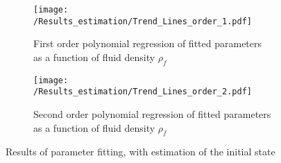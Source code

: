 \documentclass[../Article_Model_Parameters.tex]{subfiles}
\begin{document}
	\begin{figure}[!h]
	\centering
	\begin{subfigure}[b]{\columnwidth}
		\centering
		\texttt{[image: /Results\_estimation/Trend\_Lines\_order\_1.pdf]}
		\caption{First order polynomial regression of fitted parameters as a function of fluid density $\rho_f$}
	\end{subfigure}
	\begin{subfigure}[b]{\columnwidth}
		\centering
		\texttt{[image: /Results\_estimation/Trend\_Lines\_order\_2.pdf]}
		\caption{Second order polynomial regression of fitted parameters as a function of fluid density $\rho_f$}
	\end{subfigure}
	\caption{Results of parameter fitting, with estimation of the initial state} 
	\label{fig:Regression}
	\end{figure}
	
	
\end{document}
